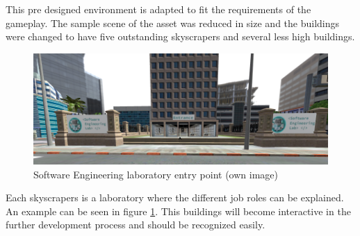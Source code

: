 This pre designed environment is adapted to fit the requirements of the gameplay. The sample scene of the asset was reduced in size and the buildings were changed to have five outstanding skyscrapers and several less high buildings.
\begin{figure}[]
  \includegraphics[width=16cm]{kapitel/software-building.PNG}
  \centering
  \caption{Software Engineering laboratory entry point (own image)}
  \label{fig:game-world-scene}
\end{figure}
Each skyscrapers is a laboratory where the different job roles can be explained. An example can be seen in figure \ref{fig:game-world-scene}. This buildings will become interactive in the further development process and should be recognized easily.
\newpage
